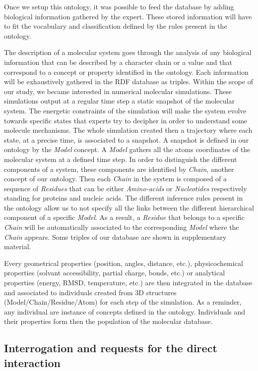 \documentclass{vgtc}                          %
\begin{document}
Once we setup this ontology, it was possible to feed the database by adding biological information gathered by the expert. These stored information will have to fit the vocabulary and classification defined by the rules present in the ontology.

The description of a molecular system goes through the analysis of any biological information that can be described by a character chain or a value and that correspond to a concept or property identified in the ontology. Each information will be exhaustively gathered in the RDF database as triples. Within the scope of our study, we became interested in numerical molecular simulations. These simulations output at a regular time step a static snapshot of the molecular system. The energetic constraints of the simulation will make the system evolve towards specific states that experts try to decipher in order to understand some molecule mechanisms. The whole simulation created then a trajectory where each state, at a precise time, is associated to a snapshot. A snapshot is defined in our ontology by the \textit{Model} concept. A \textit{Model} gathers all the atoms coordinates of the molecular system at a defined time step. In order to distinguish the different components of a system, these components are identified by \textit{Chain}, another concept of our ontology. Then each \textit{Chain} in the system is composed of a sequence of \textit{Residues} that can be either \textit{Amino-acids} or \textit{Nucleotides} respectively standing for proteins and nucleic acids. The different inference rules present in the ontology allow us to not specify all the links between the different hierarchical component of a specific \textit{Model}. As a result, a \textit{Residue} that belongs to a specific \textit{Chain} will be automatically associated to the corresponding \textit{Model} where the \textit{Chain} appears.
Some triples of our database are shown in supplementary material.

Every geometrical properties (position, angles, distance, etc.), physicochemical properties (solvant accessibility, partial charge, bonds, etc.) or analytical properties (energy, RMSD, temperature, etc.) are then integrated in the database and associated to individuals created from 3D structures (Model/Chain/Residue/Atom) for each step of the simulation. As a reminder, any individual are instance of concepts defined in the ontology. Individuals and their properties form then the population of the molecular database.

\subsection{Interrogation and requests for the direct interaction}
\end{document}
